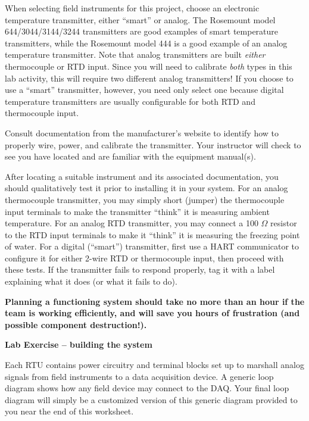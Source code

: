 \vskip 10pt

When selecting field instruments for this project, choose an electronic temperature transmitter, either ``smart'' or analog.  The Rosemount model 644/3044/3144/3244 transmitters are good examples of smart temperature transmitters, while the Rosemount model 444 is a good example of an analog temperature transmitter.  Note that analog transmitters are built {\it either} thermocouple or RTD input.  Since you will need to calibrate {\it both} types in this lab activity, this will require two different analog transmitters!  If you choose to use a ``smart'' transmitter, however, you need only select one because digital temperature transmitters are usually configurable for both RTD and thermocouple input.

Consult documentation from the manufacturer's website to identify how to properly wire, power, and calibrate the transmitter.  Your instructor will check to see you have located and are familiar with the equipment manual(s).

After locating a suitable instrument and its associated documentation, you should qualitatively test it prior to installing it in your system.  For an analog thermocouple transmitter, you may simply short (jumper) the thermocouple input terminals to make the transmitter ``think'' it is measuring ambient temperature.  For an analog RTD transmitter, you may connect a 100 $\Omega$ resistor to the RTD input terminals to make it ``think'' it is measuring the freezing point of water.  For a digital (``smart'') transmitter, first use a HART communicator to configure it for either 2-wire RTD or thermocouple input, then proceed with these tests.  If the transmitter fails to respond properly, tag it with a label explaining what it does (or what it fails to do).

\vskip 10pt

{\bf Planning a functioning system should take no more than an hour if the team is working efficiently, and will save you hours of frustration (and possible component destruction!).}









\vfil \eject

\noindent
{\bf Lab Exercise -- building the system}

\vskip 5pt

Each RTU contains power circuitry and terminal blocks set up to marshall analog signals from field instruments to a data acquisition device.  A generic loop diagram shows how any field device may connect to the DAQ.  Your final loop diagram will simply be a customized version of this generic diagram provided to you near the end of this worksheet.

